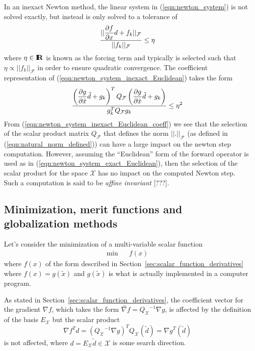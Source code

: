 \documentclass[pdf,ps2pdf,11pt]{SANDreport}
\begin{document}
In an inexact Newton method, the linear system in (\ref{eqn:newton_system}) is
not solved exactly, but instead is only solved to a tolerance of
%
\begin{equation}
\frac{||\displaystyle{\frac{\partial f}{\partial x}} d + f_k||_{\mathcal{F}}}{||f_k||_{\mathcal{F}}} \le \eta
\label{eqn:newton_system_inexact_Euclidean}
\end{equation}
%
where $\eta\in\mbox{\textbf{I}}\hspace{-0.6ex}\mbox{\textbf{R}}$ is known as the forcing term and typically is selected such
that $\eta {}\propto ||f_k||_{\mathcal{F}}$ in order to ensure quadratic
convergence.  The coefficient representation of
(\ref{eqn:newton_system_inexact_Euclidean}) takes the form
%
\begin{equation}
\frac{\left(\displaystyle{\frac{\partial g}{\partial \tilde{x}}} \tilde{d} + g_k\right)^T Q_{\mathcal{F}} \left(\displaystyle{\frac{\partial g}{\partial \tilde{x}}} \tilde{d} + g_k\right)}
{g_k^T Q_{\mathcal{F}} g_k} \le \eta^2
\label{eqn:newton_system_inexact_Euclidean_coeff}
\end{equation}
%
From (\ref{eqn:newton_system_inexact_Euclidean_coeff}) we see that the
selection of the scalar product matrix $Q_{\mathcal{F}}$ that defines the norm
$||.||_{\mathcal{F}}$ (as defined in (\ref{eqn:natural_norm_defined})) can
have a large impact on the newton step computation.  However, assuming the
``Euclidean'' form of the forward operator is used as in
(\ref{eqn:newton_system_exact_Euclidean}), then the selection of the scalar
product for the space $\mathcal{X}$ has no impact on the computed Newton step.
Such a computation is said to be {}\textit{affine invariant} [???].

\subsection{Minimization, merit functions and globalization methods}

Let's consider the minimization of a multi-variable scalar function
%
\begin{eqnarray}
\mbox{min} & & f(x)
\end{eqnarray}
%
where $f(x)$ of the form described in
Section~\ref{sec:scalar_function_derivatives} where $f(x) = g(\tilde{x})$ and
$g(\tilde{x})$ is what is actually implemented in a computer program.

As stated in Section~\ref{sec:scalar_function_derivatives}, the coefficient
vector for the gradient $\nabla f$, which takes the form $\tilde{\nabla f} =
{Q_{\mathcal{X}}}^{-1} {}\nabla g$, is affected by the definition of the basis
$E_{\mathcal{X}}$ but the scalar product
%
\begin{equation}
{\nabla f}^T d
= ({Q_{\mathcal{X}}}^{-1} {}\nabla g)^T Q_{\mathcal{X}} (\tilde{d})
 = {\nabla g}^T (\tilde{d})
\label{eqn:descent_inner_prod}
\end{equation}
%
is not affected, where $d=E_{\mathcal{X}}\tilde{d}\in\mathcal{X}$ is some
search direction.
\end{document}
